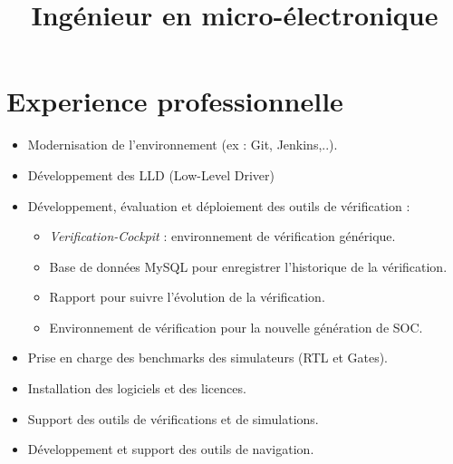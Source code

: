 \documentclass[11pt,a4paper,sans]{moderncv}
\title{Ingénieur en micro-électronique}
\begin{document}
\makecvtitle
\section{Experience professionnelle}
%
{%
\begin{itemize}%
\item Modernisation de l'environnement (ex : Git, Jenkins,..).
\item Développement des LLD (Low-Level Driver)
\end{itemize}}

%
{%
\begin{itemize}%
\item Développement, évaluation et déploiement des outils de vérification :
 \begin{itemize}%
 \item \textit{Verification-Cockpit} : environnement de vérification générique.
\item Base de données MySQL pour enregistrer l'historique de la vérification.
\item Rapport pour suivre l'évolution de la vérification.
\item Environnement de vérification pour la nouvelle génération de SOC.
\end{itemize}
\item Prise en charge des benchmarks des simulateurs (RTL et Gates).
\end{itemize}}

%
{%
\begin{itemize}%
\item Installation des logiciels et des licences.
\item Support des outils de vérifications et de simulations.
\item Développement et support des outils de navigation.
\end{itemize}}

\end{document}
